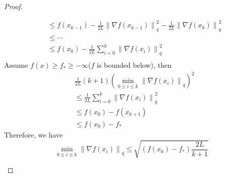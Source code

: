 \documentclass{article}
\begin{document}
\begin{proof}
\begin{itemize}
\begin{align*}
                    &\leqslant f(x_{k-1})-\frac{1}{2L}
                    \left\lVert \nabla f(x_{k-1}) \right \rVert_q^2
                    -\frac{1}{2L}
                    \left\lVert \nabla f(x_{k}) \right \rVert_q^2\\
                    &\leqslant \cdots\\
                    &\leqslant f(x_{0})-\frac{1}{2L}
                    \sum_{i=0}^k \left\lVert \nabla f(x_{i}) \right \rVert_q^2\\
            \end{align*}
            Assume $f(x)\geqslant f_{*} \geqslant -\infty$($f$ is bounded below), then
            \begin{align*}
                &\frac{1}{2L}(k+1) \left(
                    \min_{0\leqslant i \leqslant k}\left\lVert \nabla f(x_{i}) \right \rVert_q\right)^2\\
                &\leqslant \frac{1}{2L}
                \sum_{i=0}^k \left\lVert \nabla f(x_{i}) \right \rVert_q^2\\
                &\leqslant f(x_0)-f(x_{k+1})\\
                &\leqslant f(x_0)-f_{*}
            \end{align*}
            Therefore, we have
            $$\min_{0\leqslant i \leqslant k}\left\lVert \nabla f(x_{i}) \right \rVert_q \leqslant \sqrt{\left(f(x_0)-f_{*}\right)\frac{2L}{k+1}}$$
        \end{itemize}
    \end{proof}
\end{document}
